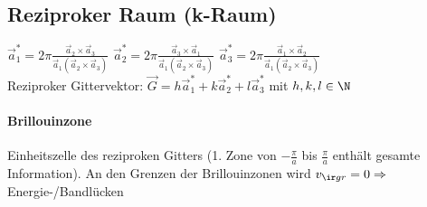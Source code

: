 \subsection{Reziproker Raum (k-Raum)}
$\vec a_1^* = 2\pi \frac{\vec a_2 \times \vec a_3}{\vec a_1(\vec a_2 \times \vec a_3)}$ \quad $\vec a_2^* = 2\pi \frac{\vec a_3 \times \vec a_1}{\vec a_1(\vec a_2 \times \vec a_3)}$ \quad $\vec a_3^* = 2\pi \frac{\vec a_1 \times \vec a_2}{\vec a_1(\vec a_2 \times \vec a_3)}$ \\
Reziproker Gittervektor: $\vec G = h\vec a_1^* + k\vec a_2^* + l\vec a_3^*$ mit $h, k, l \in \N$
\paragraph{Brillouinzone} Einheitszelle des reziproken Gitters (1. Zone von $-\frac{\pi}{a}$ bis $\frac{\pi}{a}$ enthält gesamte Information).
An den Grenzen der Brillouinzonen wird $v_{\ir gr}=0 \Rightarrow$ Energie-/Bandlücken